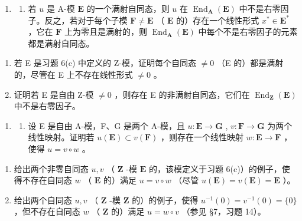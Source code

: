 \begin{enumerate}
\def\labelenumi{\arabic{enumi}.}
\setcounter{enumi}{6}
\tightlist
\item
  \begin{enumerate}
  \def\labelenumii{(\alph{enumii})}
  \tightlist
  \item
    若 \(u\) 是 A-模 \(\mathbf{E}\) 的一个满射自同态，则 \(u\) 在 \(\operatorname{End}_{\mathbf{A}}(\mathbf{E})\) 中不是右零因子。反之，若对于每个子模 \(\mathbf{F} \neq \mathbf{E}\) （ \(\mathbf{E}\) 的）存在一个线性形式 \(x^{*} \in \mathbf{E}^{*}\) ，它在 \(\mathbf{F}\) 上为零且是满射的，则 \(\operatorname{End}_{\mathbf{A}}(\mathbf{E})\) 中每个不是右零因子的元素都是满射自同态。
  \end{enumerate}
\end{enumerate}

\begin{enumerate}
\def\labelenumi{(\alph{enumi})}
\setcounter{enumi}{1}
\item
  若 E 是习题 6(c) 中定义的 Z-模，证明每个自同态 \(\neq 0\) （E 的）都是满射的，尽管在 E 上不存在线性形式 \(\neq 0\) 。
\item
  证明若 E 是自由 Z-模 \(\neq0\) ，则存在 E 的非满射自同态，它们在 \(\operatorname{End}_{\mathbf{Z}}(\mathbf{E})\) 中不是右零因子。
\end{enumerate}

\begin{enumerate}
\def\labelenumi{\arabic{enumi}.}
\setcounter{enumi}{7}
\tightlist
\item
  \begin{enumerate}
  \def\labelenumii{(\alph{enumii})}
  \tightlist
  \item
    设 E 是自由 A-模，F、G 是两个 A-模，且 \(u: \mathbf{E} \to \mathbf{G}\) , \(v: \mathbf{F} \to \mathbf{G}\) 为两个线性映射。证明若 \(u(\mathbf{E}) \subset v(\mathbf{F})\) ，则存在一个线性映射 \(w: \mathbf{E} \to \mathbf{F}\) ，使得 \(u = v \circ w\) 。
  \end{enumerate}
\end{enumerate}

\begin{enumerate}
\def\labelenumi{(\alph{enumi})}
\setcounter{enumi}{1}
\item
  给出两个非零自同态 \(u, v\) （ \(\mathbf{Z}\) -模 \(\mathbf{E}\) 的，该模定义于习题 6(c)）的例子，使得不存在自同态 \(w\) （ \(\mathbf{E}\) 的）满足 \(u = v \circ w\) （尽管 \(u(\mathbf{E}) = v(\mathbf{E}) = \mathbf{E}\) ）。
\item
  给出两个自同态 \(u, v\) （ \(\mathbf{Z}\) -模 \(\mathbf{Z}\) 的）的例子，使得 \(u^{-1}(0) = v^{-1}(0) = \{0\}\) ，但不存在自同态 \(w\) （ \(\mathbf{Z}\) 的）满足 \(u = w \circ v\) （参见 §7，习题 14）。
\end{enumerate}


